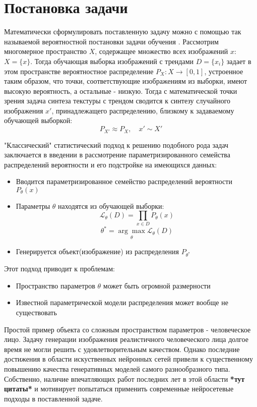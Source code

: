 \section{Постановка задачи}
	Математически сформулировать поставленную задачу можно с помощью так называемой вероятностной постановки задачи обучения \cite{Voron-ML, GAN}.
	Рассмотрим многомерное пространство $X$, содержащее множество всех изображений $x$: $X = \{x\}$. Тогда обучающая выборка изображений с трендами $D = \{x_i\}$ задает в этом пространстве вероятностное распределение $P_X : X \longrightarrow [0,1]$, устроенное таким образом, что точки, соответствующие изображениям из выборки, имеют высокую вероятность, а остальные - низкую. Тогда с математической точки зрения задача синтеза текстуры с трендом сводится к синтезу случайного изображения $x'$, принадлежащего распределению, близкому к задаваемому обучающей выборкой:
	$$ P_{X'} \approx P_X, \quad x' \sim X'$$
	
	"Классический" статистический подход к решению подобного рода задач заключается в введении в рассмотрение параметризированного семейства распределений вероятности и его подстройке на имеющихся данных:
	\begin{itemize}
		\item Вводится параметризированное семейство распределений вероятности $P_{\theta}(x)$
		\item Параметры $\theta$ находятся из обучающей выборки:
		$$ \mathcal{L}_{\theta}(D) = \prod_{x \in D} P_{\theta}(x) $$
		$$ \theta^{*} = \underset{\theta}{\arg\max} \mathcal{L}_{\theta}(D)$$
		\item Генерируется объект(изображение) из распределения $ P_{\theta^{*}}$
	\end{itemize}
	Этот подход приводит к проблемам:
	\begin{itemize}
		\item Пространство параметров $\theta$ может быть огромной размерности
		\item Известной параметрической модели распределения может вообще не существовать
	\end{itemize}
	Простой пример объекта со сложным пространством параметров - человеческое лицо. Задачу генерации изображения реалистичного человеческого лица долгое время не могли решить с удовлетворительным качеством. Однако последние достижения в области искуственных нейронных сетей привели к существенному повышению качества генеративных моделей самого разнообразного типа. Собственно, наличие впечатляющих работ последних лет в этой области \textbf{*тут цитаты*} и мотивирует попытаться применить современные нейросетевые подходы в поставленной задаче.